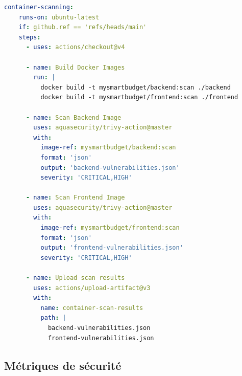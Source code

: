 \begin{exemple}
\begin{lstlisting}[language=yaml]
  container-scanning:
    runs-on: ubuntu-latest
    if: github.ref == 'refs/heads/main'
    steps:
      - uses: actions/checkout@v4
      
      - name: Build Docker Images
        run: |
          docker build -t mysmartbudget/backend:scan ./backend
          docker build -t mysmartbudget/frontend:scan ./frontend
          
      - name: Scan Backend Image
        uses: aquasecurity/trivy-action@master
        with:
          image-ref: mysmartbudget/backend:scan
          format: 'json'
          output: 'backend-vulnerabilities.json'
          severity: 'CRITICAL,HIGH'
          
      - name: Scan Frontend Image  
        uses: aquasecurity/trivy-action@master
        with:
          image-ref: mysmartbudget/frontend:scan
          format: 'json'
          output: 'frontend-vulnerabilities.json'
          severity: 'CRITICAL,HIGH'
          
      - name: Upload scan results
        uses: actions/upload-artifact@v3
        with:
          name: container-scan-results
          path: |
            backend-vulnerabilities.json
            frontend-vulnerabilities.json
\end{lstlisting}
\end{exemple}

\subsection{Métriques de sécurité}

